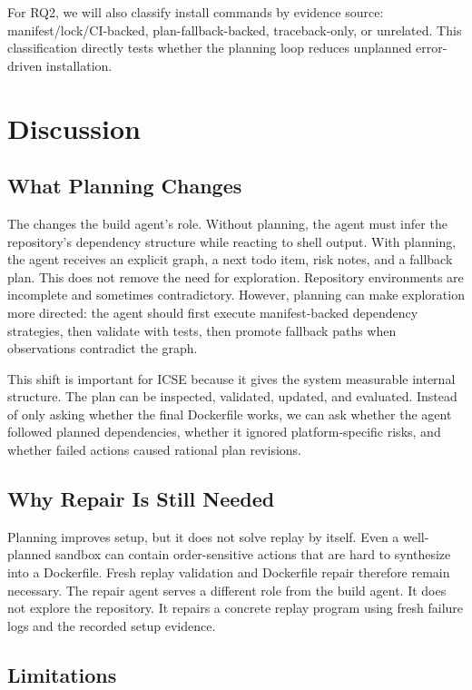For RQ2, we will also classify install commands by evidence source: manifest/lock/CI-backed, plan-fallback-backed, traceback-only, or unrelated.
This classification directly tests whether the planning loop reduces unplanned error-driven installation.

\section{Discussion}

\subsection{What Planning Changes}

The \planner changes the build agent's role.
Without planning, the agent must infer the repository's dependency structure while reacting to shell output.
With planning, the agent receives an explicit graph, a next todo item, risk notes, and a fallback plan.
This does not remove the need for exploration.
Repository environments are incomplete and sometimes contradictory.
However, planning can make exploration more directed: the agent should first execute manifest-backed dependency strategies, then validate with tests, then promote fallback paths when observations contradict the graph.

This shift is important for ICSE because it gives the system measurable internal structure.
The plan can be inspected, validated, updated, and evaluated.
Instead of only asking whether the final Dockerfile works, we can ask whether the agent followed planned dependencies, whether it ignored platform-specific risks, and whether failed actions caused rational plan revisions.

\subsection{Why Repair Is Still Needed}

Planning improves setup, but it does not solve replay by itself.
Even a well-planned sandbox can contain order-sensitive actions that are hard to synthesize into a Dockerfile.
Fresh replay validation and Dockerfile repair therefore remain necessary.
The repair agent serves a different role from the build agent.
It does not explore the repository.
It repairs a concrete replay program using fresh failure logs and the recorded setup evidence.

\subsection{Limitations}


